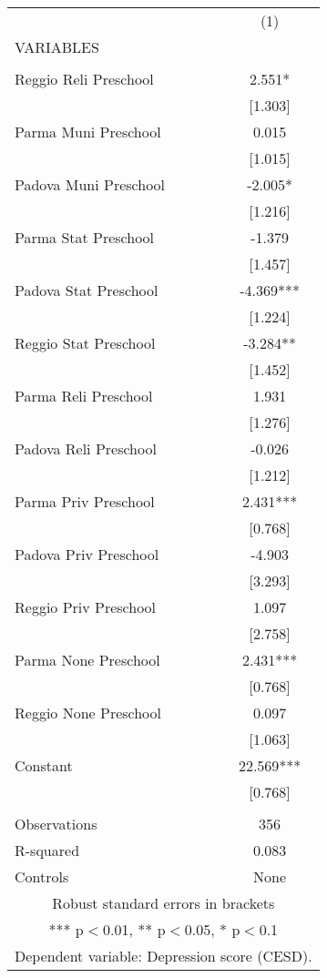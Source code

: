 \begin{tabular}{lc} \hline
 & (1) \\
VARIABLES &  \\ \hline
 &  \\
Reggio Reli Preschool & 2.551* \\
 & [1.303] \\
Parma Muni Preschool & 0.015 \\
 & [1.015] \\
Padova Muni Preschool & -2.005* \\
 & [1.216] \\
Parma Stat Preschool & -1.379 \\
 & [1.457] \\
Padova Stat Preschool & -4.369*** \\
 & [1.224] \\
Reggio Stat Preschool & -3.284** \\
 & [1.452] \\
Parma Reli Preschool & 1.931 \\
 & [1.276] \\
Padova Reli Preschool & -0.026 \\
 & [1.212] \\
Parma Priv Preschool & 2.431*** \\
 & [0.768] \\
Padova Priv Preschool & -4.903 \\
 & [3.293] \\
Reggio Priv Preschool & 1.097 \\
 & [2.758] \\
Parma None Preschool & 2.431*** \\
 & [0.768] \\
Reggio None Preschool & 0.097 \\
 & [1.063] \\
Constant & 22.569*** \\
 & [0.768] \\
 &  \\
Observations & 356 \\
R-squared & 0.083 \\
 Controls & None \\ \hline
\multicolumn{2}{c}{ Robust standard errors in brackets} \\
\multicolumn{2}{c}{ *** p$<$0.01, ** p$<$0.05, * p$<$0.1} \\
\multicolumn{2}{c}{ Dependent variable: Depression score (CESD).} \\
\end{tabular}
